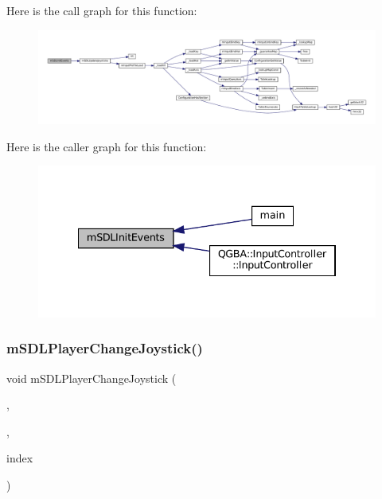 Here is the call graph for this function\+:
\nopagebreak
\begin{figure}[H]
\begin{center}
\leavevmode
\includegraphics[width=350pt]{sdl-events_8h_a803e62a43bd8bd79f66510edda922fd0_cgraph}
\end{center}
\end{figure}
Here is the caller graph for this function\+:
\nopagebreak
\begin{figure}[H]
\begin{center}
\leavevmode
\includegraphics[width=334pt]{sdl-events_8h_a803e62a43bd8bd79f66510edda922fd0_icgraph}
\end{center}
\end{figure}
\mbox{\label{sdl-events_8h_a3a4fc78a8a0a3803658a89cce1b2f300}} 
\subsubsection{\texorpdfstring{m\+S\+D\+L\+Player\+Change\+Joystick()}{mSDLPlayerChangeJoystick()}}
{\footnotesize\ttfamily void m\+S\+D\+L\+Player\+Change\+Joystick (\begin{DoxyParamCaption}\item[{struct \mbox{\hyperlink{sdl-events_8h_structm_s_d_l_events}{m\+S\+D\+L\+Events}} $\ast$}]{,  }\item[{struct \mbox{\hyperlink{sdl-events_8h_structm_s_d_l_player}{m\+S\+D\+L\+Player}} $\ast$}]{,  }\item[{size\+\_\+t}]{index }\end{DoxyParamCaption})}

